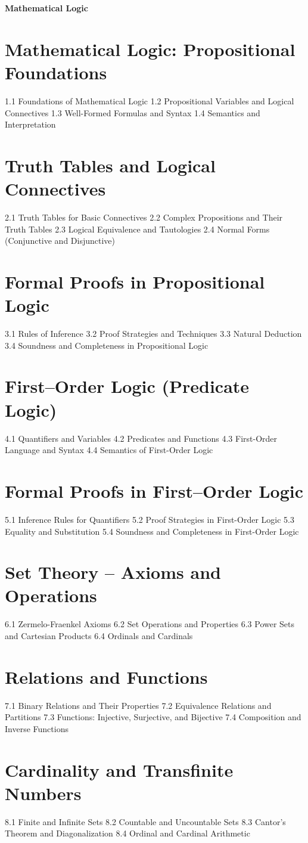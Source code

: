 ﻿{\LARGE \bf{Mathematical Logic}}

\section{Mathematical Logic: Propositional Foundations}
1.1 Foundations of Mathematical Logic
1.2 Propositional Variables and Logical Connectives
1.3 Well-Formed Formulas and Syntax
1.4 Semantics and Interpretation
\section{Truth Tables and Logical Connectives}
2.1 Truth Tables for Basic Connectives
2.2 Complex Propositions and Their Truth Tables
2.3 Logical Equivalence and Tautologies
2.4 Normal Forms (Conjunctive and Disjunctive)
\section{Formal Proofs in Propositional Logic}
3.1 Rules of Inference
3.2 Proof Strategies and Techniques
3.3 Natural Deduction
3.4 Soundness and Completeness in Propositional Logic
\section{First–Order Logic (Predicate Logic)}
4.1 Quantifiers and Variables
4.2 Predicates and Functions
4.3 First-Order Language and Syntax
4.4 Semantics of First-Order Logic
\section{Formal Proofs in First–Order Logic}
5.1 Inference Rules for Quantifiers
5.2 Proof Strategies in First-Order Logic
5.3 Equality and Substitution
5.4 Soundness and Completeness in First-Order Logic
\section{Set Theory – Axioms and Operations}
6.1 Zermelo-Fraenkel Axioms
6.2 Set Operations and Properties
6.3 Power Sets and Cartesian Products
6.4 Ordinals and Cardinals
\section{Relations and Functions}
7.1 Binary Relations and Their Properties
7.2 Equivalence Relations and Partitions
7.3 Functions: Injective, Surjective, and Bijective
7.4 Composition and Inverse Functions
\section{Cardinality and Transfinite Numbers}
8.1 Finite and Infinite Sets
8.2 Countable and Uncountable Sets
8.3 Cantor's Theorem and Diagonalization
8.4 Ordinal and Cardinal Arithmetic
